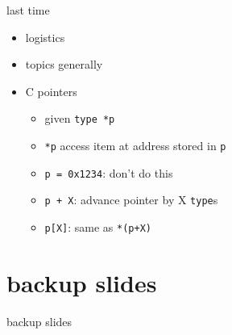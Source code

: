\date{}
\title{}
\date{}

\begin{frame}
    \titlepage
\end{frame}

\begin{frame}{last time}
    \begin{itemize}
    \item logistics
    \item topics generally
    \item C pointers
        \begin{itemize}
            \item given \texttt{type *p}
            \item \texttt{*p} access item at address stored in \texttt{p}
            \item \texttt{p = 0x1234}: don't do this
            \item \texttt{p + X}: advance pointer by X \texttt{type}s
            \item \texttt{p[X]}: same as \texttt{*(p+X)}
        \end{itemize}
    \end{itemize}
\end{frame}





\section{backup slides}
\begin{frame}{backup slides}
\end{frame}


